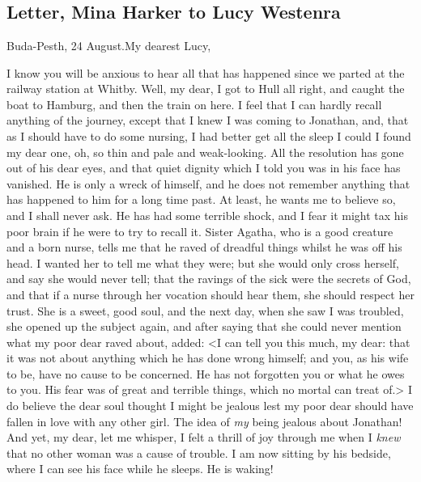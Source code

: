 \chapter[Chapter \thechapter]{}

\section{Letter, Mina Harker to Lucy Westenra}

\begin{mail}{Buda-Pesth, 24 August.}{My dearest Lucy,}

I know you will be anxious to hear all that has happened since we parted at the railway station at Whitby. Well, my dear, I got to Hull all right, and caught the boat to Hamburg, and then the train on here. I feel that I can hardly recall anything of the journey, except that I knew I was coming to Jonathan, and, that as I should have to do some nursing, I had better get all the sleep I could I found my dear one, oh, so thin and pale and weak-looking. All the resolution has gone out of his dear eyes, and that quiet dignity which I told you was in his face has vanished. He is only a wreck of himself, and he does not remember anything that has happened to him for a long time past. At least, he wants me to believe so, and I shall never ask. He has had some terrible shock, and I fear it might tax his poor brain if he were to try to recall it. Sister Agatha, who is a good creature and a born nurse, tells me that he raved of dreadful things whilst he was off his head. I wanted her to tell me what they were; but she would only cross herself, and say she would never tell; that the ravings of the sick were the secrets of God, and that if a nurse through her vocation should hear them, she should respect her trust. She is a sweet, good soul, and the next day, when she saw I was troubled, she opened up the subject again, and after saying that she could never mention what my poor dear raved about, added: <I can tell you this much, my dear: that it was not about anything which he has done wrong himself; and you, as his wife to be, have no cause to be concerned. He has not forgotten you or what he owes to you. His fear was of great and terrible things, which no mortal can treat of.> I do believe the dear soul thought I might be jealous lest my poor dear should have fallen in love with any other girl. The idea of \textit{my} being jealous about Jonathan! And yet, my dear, let me whisper, I felt a thrill of joy through me when I \textit{knew} that no other woman was a cause of trouble. I am now sitting by his bedside, where I can see his face while he sleeps. He is waking!\textellipsis


\end{mail}
